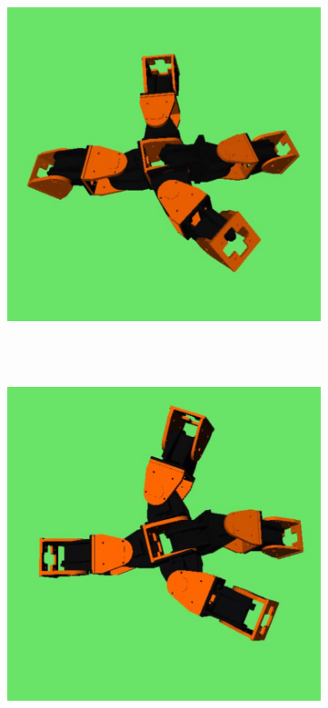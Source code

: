 \begin{figure}[h]
\begin{subfigure}[b]{0.18\textwidth}
                 \\~
        \end{subfigure}
        ~
        \begin{subfigure}[b]{0.18\textwidth}
         	   \centering
                \includegraphics[width=\textwidth]{images/results_9_gait_04.png}
                 \\~
        \end{subfigure}
        ~
        \begin{subfigure}[b]{0.18\textwidth}
         	   \centering
                \includegraphics[width=\textwidth]{images/results_9_gait_05.png}

\end{subfigure}
\end{figure}
